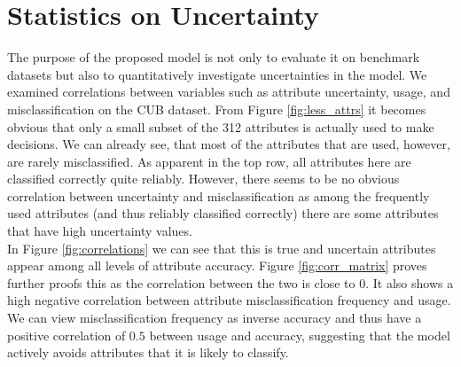 \documentclass[a4paper,cleardoubleempty,BCOR1cm, 11pt]{report}
\begin{document}
\section{Statistics on Uncertainty}
The purpose of the proposed model is not only to evaluate it on benchmark datasets but also to quantitatively investigate uncertainties in the model. We examined correlations between variables such as attribute uncertainty, usage, and misclassification on the CUB dataset. From Figure \ref{fig:less_attrs} it becomes obvious that only a small subset of the 312 attributes is actually used to make decisions. We can already see, that most of the attributes that are used, however, are rarely misclassified. As apparent in the top row, all attributes here are classified correctly quite reliably. However, there seems to be no obvious correlation between uncertainty and misclassification as among the frequently used attributes (and thus reliably classified correctly) there are some attributes that have high uncertainty values.\\
In Figure \ref{fig:correlations} we can see that this is true and uncertain attributes appear among all levels of attribute accuracy. Figure \ref{fig:corr_matrix} proves further proofs this as the correlation between the two is close to $0$. It also shows a high negative correlation between attribute misclassification frequency and usage. We can view misclassification frequency as inverse accuracy and thus have a positive correlation of $0.5$ between usage and accuracy, suggesting that the model actively avoids attributes that it is likely to classify.
\end{document}
